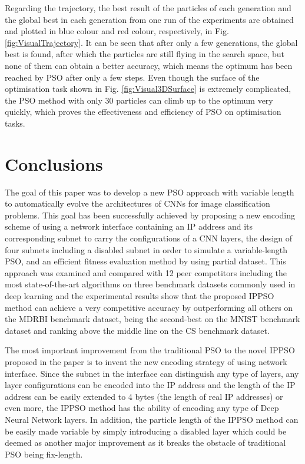 \documentclass[conference]{IEEEtran}
\begin{document}
Regarding the trajectory, the best result of the particles of each generation and the global best in each generation from one run of the experiments are obtained and plotted in blue colour and red colour, respectively, in Fig. \ref{fig:VisualTrajectory}. It can be seen that after only a few generations, the global best is found, after which the particles are still flying in the search space, but none of them can obtain a better accuracy, which means the optimum has been reached by PSO after only a few steps. Even though the surface of the optimisation task shown in Fig. \ref{fig:Visual3DSurface} is extremely complicated, the PSO method with only 30 particles can climb up to the optimum very quickly, which proves the effectiveness and efficiency of PSO on optimisation tasks.



















\section{Conclusions}\label{sec:Conclusion}

The goal of this paper was to develop a new PSO approach with variable length to automatically evolve the architectures of CNNs for image classification problems. This goal has been successfully achieved by proposing a new encoding scheme of using a network interface containing an IP address and its corresponding subnet to carry the configurations of a CNN layers, the design of four subnets including a disabled subnet in order to simulate a variable-length PSO, and an efficient fitness evaluation method by using partial dataset. This approach was examined and compared with 12 peer competitors including the most state-of-the-art algorithms on three benchmark datasets commonly used in deep learning and the experimental results show that the proposed IPPSO method can achieve a very competitive accuracy by outperforming all others on the MDRBI benchmark dataset, being the second-best on the MNIST benchmark dataset and ranking above the middle line on the CS benchmark dataset.


The most important improvement from the traditional PSO to the novel IPPSO proposed in the paper is to invent the new encoding strategy of using network interface. Since the subnet in the interface can distinguish any type of layers, any layer configurations can be encoded into the IP address and the length of the IP address can be easily extended to 4 bytes (the length of real IP addresses) or even more, the IPPSO method has the ability of encoding any type of Deep Neural Network layers. In addition, the particle length of the IPPSO method can be easily made variable by simply introducing a disabled layer which could be deemed as another major improvement as it breaks the obstacle of traditional PSO being fix-length.
\end{document}
